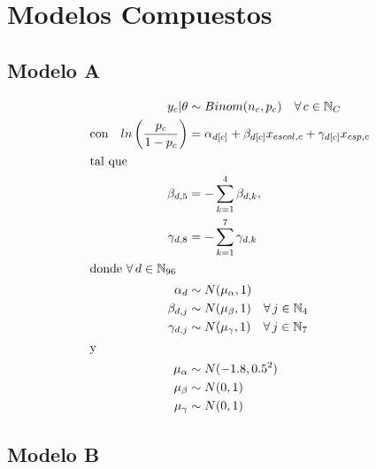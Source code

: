 \chapter{Modelos Compuestos\label{anexo:modelos_compuestos}}

\section*{Modelo A}

\begin{align}\label{eq:Modelo_Comp_A_Anexo}
y_c|\theta & \sim Binom(n_c,p_c) \quad \forall \, c \in \mathbb{N}_C \nonumber \\
\text{con} \quad ln\left(\dfrac{p_c}{1-p_c}\right) &= \alpha_{d[c]} + \beta_{d[c]} x_{escol,c} + \gamma_{d[c]} x_{csp,c} \\ 
\intertext{tal que} 
\beta_{d,5} &= -\sum\limits_{k = 1}^{4} \beta_{d,k}, \nonumber \\
\gamma_{d,8} &= -\sum\limits_{k = 1}^{7} \gamma_{d,k} \nonumber \\
\intertext{donde $\forall \, d \in \mathbb{N}_{96}$}
\alpha_d & \sim N(\mu_{\alpha}, 1) \quad  \nonumber \\
\beta_{d,j} & \sim N(\mu_{\beta}, 1) \quad \forall \, j \in \mathbb{N}_{4} \nonumber \\
\gamma_{d,j} & \sim N(\mu_{\gamma}, 1) \quad \forall \, j \in \mathbb{N}_{7} \nonumber \\
\intertext{y}
\mu_{\alpha} &\sim N(-1.8,0.5^2) \nonumber \\
\mu_{\beta} &\sim N(0,1) \nonumber \\
\mu_{\gamma} &\sim N(0,1) \nonumber
\end{align}

\section*{Modelo B}

